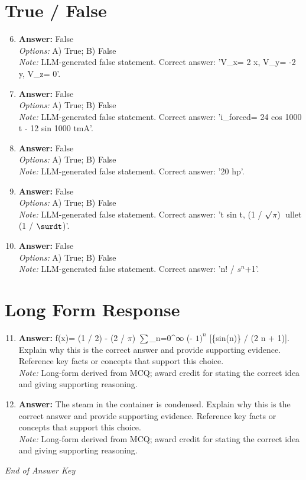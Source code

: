 \documentclass[12pt]{article}
\begin{document}
\section*{True / False}
\begin{enumerate}[label=\arabic*.]
\setcounter{enumi}{5}
\item \textbf{Answer:} False
\\ \textit{Options:} A) True; B) False
\\ \textit{Note:} LLM-generated false statement. Correct answer: 'V\_x= 2 x, V\_y= -2 y, V\_z= 0'.
\item \textbf{Answer:} False
\\ \textit{Options:} A) True; B) False
\\ \textit{Note:} LLM-generated false statement. Correct answer: 'i\_forced= 24 cos 1000 t - 12 sin 1000 tmA'.
\item \textbf{Answer:} False
\\ \textit{Options:} A) True; B) False
\\ \textit{Note:} LLM-generated false statement. Correct answer: '20 hp'.
\item \textbf{Answer:} False
\\ \textit{Options:} A) True; B) False
\\ \textit{Note:} LLM-generated false statement. Correct answer: 't sin t, (1 / \ensuremath{\surd}\ensuremath{\pi}) ullet (1 / \ensuremath{\surdt})'.
\item \textbf{Answer:} False
\\ \textit{Options:} A) True; B) False
\\ \textit{Note:} LLM-generated false statement. Correct answer: 'n! / $s^n$+1'.
\end{enumerate}

\section*{Long Form Response}
\begin{enumerate}[label=\arabic*.]
\setcounter{enumi}{10}
\item \textbf{Answer:} f(x)= (1 / 2) - (2 / \ensuremath{\pi}) \ensuremath{\sum}\_n=0^∞ (- $1)^n$ [\{sin(n)\} / (2 n + 1)]. Explain why this is the correct answer and provide supporting evidence. Reference key facts or concepts that support this choice.
\\ \textit{Note:} Long-form derived from MCQ; award credit for stating the correct idea and giving supporting reasoning.
\item \textbf{Answer:} The steam in the container is condensed. Explain why this is the correct answer and provide supporting evidence. Reference key facts or concepts that support this choice.
\\ \textit{Note:} Long-form derived from MCQ; award credit for stating the correct idea and giving supporting reasoning.
\end{enumerate}

\vfill
\noindent\textit{End of Answer Key}
\end{document}
